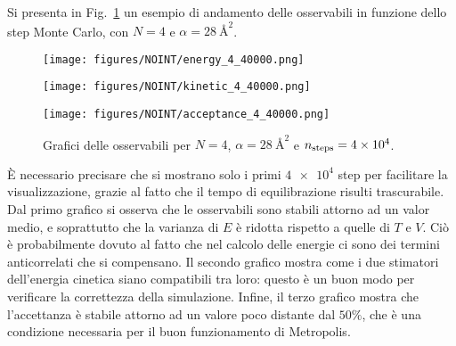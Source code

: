 \documentclass[a4paper, titlepage]{article}
\begin{document}
Si presenta in Fig.\ \ref{fig:NOINT_obs} un esempio di andamento delle osservabili in funzione dello step Monte Carlo, con $N = 4$ e $\alpha = 28\ \unit{\angstrom\squared}$.
\begin{figure}[h!]
    \centering
    \begin{minipage}{0.32 \textwidth}
        \centering
        \texttt{[image: figures/NOINT/energy\_4\_40000.png]}
        \label{fig:energyNOINT}
    \end{minipage}
    \begin{minipage}{0.32 \textwidth}
        \centering
        \texttt{[image: figures/NOINT/kinetic\_4\_40000.png]}
        \label{fig:kineticNOINT}
    \end{minipage}
    \begin{minipage}{0.32 \textwidth}
        \centering
        \texttt{[image: figures/NOINT/acceptance\_4\_40000.png]}
        \label{fig:acceptanceNOINT}
    \end{minipage}
    \vspace{-0.5cm}
    \caption{Grafici delle osservabili per $N = 4$, $\alpha = 28\ \unit{\angstrom\squared}$ e $n_{\rm steps} = \num{4e4}$.}
    \label{fig:NOINT_obs}
\end{figure}
È necessario precisare che si mostrano solo i primi $\num{4e4}$ step per facilitare la visualizzazione, grazie al fatto che il tempo di equilibrazione risulti trascurabile. Dal primo grafico si osserva che le osservabili sono stabili attorno ad un valor medio, e soprattutto che la varianza di $E$ è ridotta rispetto a quelle di $T$ e $V$. Ciò è probabilmente dovuto al fatto che nel calcolo delle energie ci sono dei termini anticorrelati che si compensano. Il secondo grafico mostra come i due stimatori dell'energia cinetica siano compatibili tra loro: questo è un buon modo per verificare la correttezza della simulazione. Infine, il terzo grafico mostra che l'accettanza è stabile attorno ad un valore poco distante dal $50\%$, che è una condizione necessaria per il buon funzionamento di Metropolis.
\end{document}
